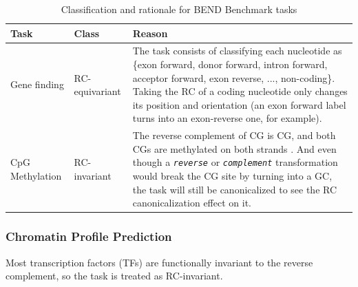 \documentclass[   ]{article}
\let\oldtexttt\texttt
\renewcommand{\texttt}[1]{\oldtexttt{\itshape #1}}
\begin{document}
\begin{table}[H]
	\centering
	\caption{Classification and rationale for BEND Benchmark tasks}
	\label{tab:bend_benchmark}
	
	\begin{tabularx}{\linewidth}{p{3cm} p{3cm} X}
		\toprule
		Task & Class & Reason \\
		\midrule
		
		Gene finding & RC-equivariant & The task consists of classifying each nucleotide as \{exon forward, donor forward, intron forward, acceptor forward, exon reverse, ..., non-coding\}. Taking the RC of a coding nucleotide only changes its position and orientation (an exon forward label turns into an exon-reverse one, for example). \\
		
		\midrule
		
		CpG Methylation & RC-invariant & The reverse complement of CG is CG, and both CGs are methylated on both strands \citep{birdUseRestrictionEnzymes1978}. And even though a \texttt{reverse} or \texttt{complement} transformation would break the CG site by turning into a GC, the task will still be canonicalized to see the RC canonicalization effect on it.\\
		
		\bottomrule
	\end{tabularx}
\end{table}

\subsubsection{Chromatin Profile Prediction}

Most transcription factors (TFs) are functionally invariant to the reverse complement\citep{coonsDecodingInversionSymmetry2019}, so the task
is treated as RC-invariant. 
\end{document}
